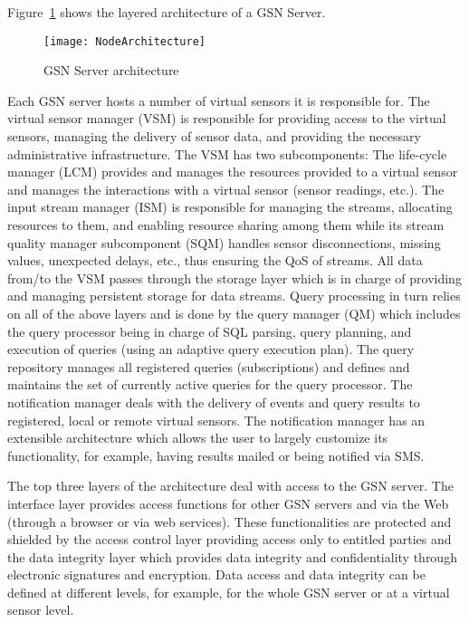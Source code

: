 Figure~\ref{fig:NodeArchitecture} shows the layered architecture of a
GSN Server.

\begin{figure}%
  \centering
  \texttt{[image: NodeArchitecture]}
  \caption{GSN Server architecture}
  \label{fig:NodeArchitecture}
\end{figure}

Each GSN server hosts a number of virtual sensors it is responsible
for. The virtual sensor manager (VSM) is responsible for providing
access to the virtual sensors, managing the delivery of sensor data,
and providing the necessary administrative infrastructure. The VSM has
two subcomponents: The life-cycle manager (LCM) provides and manages
the resources provided to a virtual sensor and manages the
interactions with a virtual sensor (sensor readings, etc.). The input
stream manager (ISM) is responsible for managing the streams,
allocating resources to them, and enabling resource sharing among them
while its stream quality manager subcomponent (SQM) handles sensor
disconnections, missing values, unexpected delays, etc., thus ensuring
the QoS of streams. All data from/to the VSM passes through the
storage layer which is in charge of providing and managing persistent
storage for data streams. Query processing in turn relies on all of
the above layers and is done by the query manager (QM) which includes
the query processor being in charge of SQL parsing, query planning,
and execution of queries (using an adaptive query execution plan). The
query repository manages all registered queries (subscriptions) and
defines and maintains the set of currently active queries for the
query processor.  The notification manager deals with the delivery of
events and query results to registered, local or remote virtual sensors. The
notification manager has an extensible architecture which allows the
user to largely customize its functionality, for example, having
results mailed or being notified via SMS.

The top three layers of the architecture deal with access to the GSN
server. The interface layer provides access functions for other GSN
servers and via the Web (through a browser or via web services).
These functionalities are protected and shielded by the access control
layer providing access only to entitled parties and the data integrity
layer which provides data integrity and confidentiality through
electronic signatures and encryption. Data access and data integrity
can be defined at different levels, for example, for the whole GSN
server or at a virtual sensor level.

